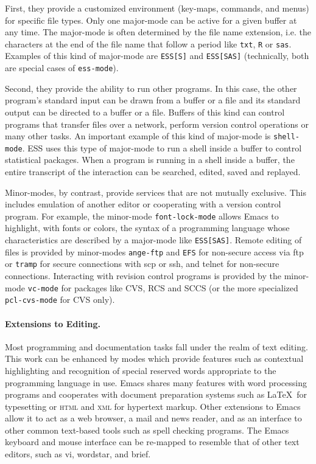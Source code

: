 \documentclass{article}
\newcommand{\stexttt}[1]{{\small\texttt{#1}}}
\begin{document}
First, they provide a customized environment (key-maps, commands, and menus) 
for specific file types.  Only 
one major-mode can be active for a given buffer at any time.  The major-mode 
is often determined by the file name extension, i.e. the characters at the 
end of the file name that follow a period like \stexttt{txt}, \stexttt{R} or
\stexttt{sas}.  Examples of this kind of major-mode are \stexttt{ESS[S]} and 
\stexttt{ESS[SAS]} (technically, both are special cases of \stexttt{ess-mode}).

Second, they provide the ability to run other programs.
In this case, the other program's standard input can be drawn from a buffer
or a file and its standard output can be directed to a buffer or a
file.  Buffers of this kind can control programs that transfer files
over a network, perform version control operations or many other
tasks.  An important example of this kind of major-mode is
\stexttt{shell-mode}.  ESS uses this type of major-mode to run a shell
inside a buffer to control statistical packages.  When a program is running 
in a shell inside a buffer, the entire transcript of the interaction can 
be searched, edited, saved and replayed.

Minor-modes, by contrast, provide services that are not mutually
exclusive.  This includes emulation of another editor or cooperating
with a version control program.  For example, the minor-mode
\stexttt{font-lock-mode} allows Emacs to highlight, with fonts or
colors, the syntax of a programming language whose characteristics are
described by a major-mode like \stexttt{ESS[SAS]}.  Remote editing of files is
provided by minor-modes \stexttt{ange-ftp} and \stexttt{EFS} for
non-secure access via ftp or \stexttt{tramp} for secure connections
with scp or ssh, and telnet for non-secure connections.
Interacting with revision control programs is provided by the minor-mode 
\stexttt{vc-mode} for packages like CVS, RCS and SCCS (or the more
specialized \stexttt{pcl-cvs-mode} for CVS only).

\paragraph{Extensions to Editing.}
Most programming and documentation tasks fall under the realm of text
editing.  This work can be enhanced by modes which provide features such
as contextual highlighting and recognition of special reserved words
appropriate to the programming language in use.  
Emacs shares many features with word processing
programs and cooperates with document preparation systems
such as \LaTeX\ for typesetting or \textsc{html} and \textsc{xml}
for hypertext markup.
Other extensions to Emacs allow it to act as a web browser, a mail and news
reader, and as an interface to
other common text-based tools such as spell checking programs.  The
Emacs keyboard and mouse interface can be re-mapped to resemble that
of other text editors, such as vi, wordstar, and brief.
\end{document}
